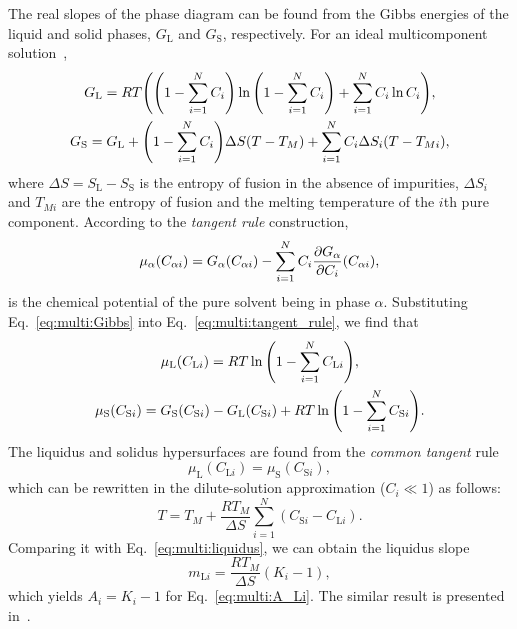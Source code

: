 \documentclass{article}
\newcommand{\liq}{\text{L}}
\newcommand{\sol}{\text{S}}
\begin{document}
The real slopes of the phase diagram can be found from the Gibbs energies of the liquid and solid phases,
$G_\liq$ and $G_\sol$, respectively.
For an ideal multicomponent solution~\cite{dantzig2016solidification},
\begin{equation}\label{eq:multi:Gibbs}
    \begin{gathered}
        G_\liq = RT\qty(\qty(1-\sum_{i=1}^N C_i)\ln\qty(1-\sum_{i=1}^N C_i) + \sum_{i=1}^N C_i\ln C_i), \\
        G_\sol = G_\liq + \qty(1-\sum_{i=1}^N C_i)\Delta{S}(T - T_M) + \sum_{i=1}^N C_i\Delta{S}_i(T - T_{Mi}),
    \end{gathered}
\end{equation}
where $\Delta{S} = S_\liq - S_\sol$ is the entropy of fusion in the absence of impurities,
$\Delta{S}_i$ and $T_{Mi}$ are the entropy of fusion and the melting temperature of the $i$th pure component.
According to the \emph{tangent rule} construction,
\begin{equation}\label{eq:multi:tangent_rule}
    \mu_\alpha(C_{\alpha i}) = G_\alpha(C_{\alpha i}) - \sum_{i=1}^N C_i{\pdv{G_\alpha}{C_i}}(C_{\alpha i}),
\end{equation}
is the chemical potential of the pure solvent being in phase $\alpha$.
Substituting Eq.~\eqref{eq:multi:Gibbs} into Eq.~\eqref{eq:multi:tangent_rule}, we find that
\begin{equation}\label{eq:multi:mu}
    \begin{gathered}
        \mu_\liq(C_{\liq i}) = RT\ln\qty(1 - \sum_{i=1}^N C_{\liq i}), \\
        \mu_\sol(C_{\sol i}) = G_\sol(C_{\sol i}) - G_\liq(C_{\sol i}) + RT\ln\qty(1 - \sum_{i=1}^N C_{\sol i}).
    \end{gathered}
\end{equation}
The liquidus and solidus hypersurfaces are found from the \emph{common tangent} rule
\begin{equation}\label{eq:multi:common_tangent}
    \mu_\liq(C_{\liq i}) = \mu_\sol(C_{\sol i}),
\end{equation}
which can be rewritten in the dilute-solution approximation ($C_i\ll1$) as follows:
\begin{equation}\label{eq:multi:common_tangent2}
    T = T_M + \frac{RT_M}{\Delta{S}}\sum_{i=1}^N(C_{\sol i} - C_{\liq i}).
\end{equation}
Comparing it with Eq.~\eqref{eq:multi:liquidus}, we can obtain the liquidus slope
\begin{equation}\label{eq:multi:mL}
    m_{\liq i} = \frac{RT_M}{\Delta{S}}(K_i - 1),
\end{equation}
which yields $A_i = K_i-1$ for Eq.~\eqref{eq:multi:A_Li}.
The similar result is presented in~\cite[Appendix C]{kundin2015phase}.

\printbibliography
\end{document}

